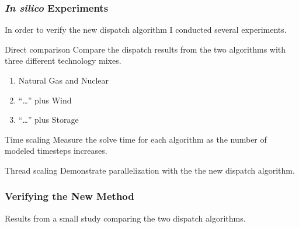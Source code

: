 \begin{frame}
    \frametitle{\textit{In silico} Experiments}

    In order to verify the new dispatch algorithm I conducted several 
    experiments.
    \pause
    \begin{block}{Direct comparison}
        Compare the dispatch results from the two algorithms with three different technology mixes.
        \begin{enumerate}
            \item Natural Gas and Nuclear
            \item ``\dots'' plus Wind
            \item ``\dots'' plus Storage
        \end{enumerate}
    \end{block}
    \pause
    \begin{block}{Time scaling}
        Measure the solve time for each algorithm as the number of modeled timesteps increases.
    \end{block}
    \pause
    \begin{block}{Thread scaling}
        Demonstrate parallelization with the the new dispatch algorithm.
    \end{block}
\end{frame}

\begin{frame}
    \frametitle{Verifying the New Method}

    \begin{table}
        \centering
        \caption{Results from a small study comparing the two dispatch
        algorithms. }
        \label{tab:alg-comparison}
        \resizebox{0.8\columnwidth}{!}{}
    \end{table}

\end{frame}


    
